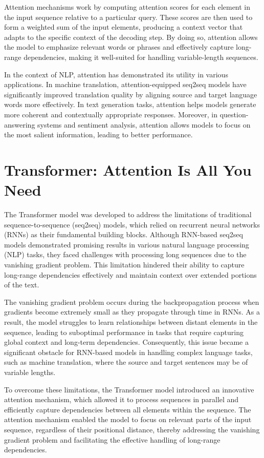 \documentclass{article}
\begin{document}
Attention mechanisms work by computing attention scores for each element in the input sequence relative to a particular query. These scores are then used to form a weighted sum of the input elements, producing a context vector that adapts to the specific context of the decoding step. By doing so, attention allows the model to emphasize relevant words or phrases and effectively capture long-range dependencies, making it well-suited for handling variable-length sequences.

In the context of NLP, attention has demonstrated its utility in various applications. In machine translation, attention-equipped seq2seq models have significantly improved translation quality by aligning source and target language words more effectively. In text generation tasks, attention helps models generate more coherent and contextually appropriate responses. Moreover, in question-answering systems and sentiment analysis, attention allows models to focus on the most salient information, leading to better performance.

\section{Transformer: Attention Is All You Need}


The Transformer model was developed to address the limitations of traditional sequence-to-sequence (seq2seq) models, which relied on recurrent neural networks (RNNs) as their fundamental building blocks. Although RNN-based seq2seq models demonstrated promising results in various natural language processing (NLP) tasks, they faced challenges with processing long sequences due to the vanishing gradient problem. This limitation hindered their ability to capture long-range dependencies effectively and maintain context over extended portions of the text.

The vanishing gradient problem occurs during the backpropagation process when gradients become extremely small as they propagate through time in RNNs. As a result, the model struggles to learn relationships between distant elements in the sequence, leading to suboptimal performance in tasks that require capturing global context and long-term dependencies. Consequently, this issue became a significant obstacle for RNN-based models in handling complex language tasks, such as machine translation, where the source and target sentences may be of variable lengths.

To overcome these limitations, the Transformer model introduced an innovative attention mechanism, which allowed it to process sequences in parallel and efficiently capture dependencies between all elements within the sequence. The attention mechanism enabled the model to focus on relevant parts of the input sequence, regardless of their positional distance, thereby addressing the vanishing gradient problem and facilitating the effective handling of long-range dependencies.
\end{document}
